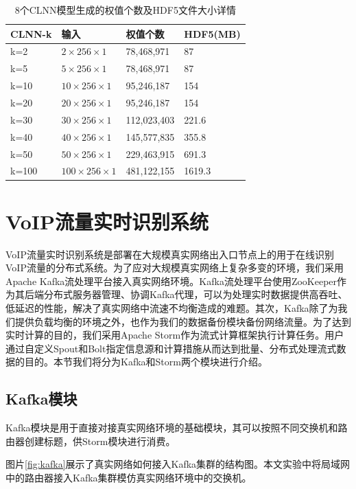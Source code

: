 \begin{table}
  \caption{8个CLNN模型生成的权值个数及HDF5文件大小详情}
  \label{tab:params}
  \centering
  \begin{tabular}{l l l l}
    \hline
    \textbf{CLNN-k} & \textbf{输入} & \textbf{权值个数}&\textbf{HDF5(MB)}\\
    \hline
    k=2      & ${2 \times 256 \times 1}$  & 78,468,971  &87  \\
    k=5      & ${5 \times 256 \times 1}$  & 78,468,971  &87  \\
    k=10      & ${10 \times 256 \times 1}$  & 95,246,187  &154  \\
    k=20      & ${20 \times 256 \times 1}$  & 95,246,187  &154 \\
    k=30     & ${30 \times 256 \times 1}$  & 112,023,403  &221.6  \\
    k=40     & ${40 \times 256 \times 1}$  & 145,577,835  &355.8 \\
    k=50     & ${50 \times 256 \times 1}$  & 229,463,915  &691.3  \\
    k=100    & ${100 \times 256 \times 1}$  & 481,122,155  &1619.3  \\
    \hline
  \end{tabular}
\end{table}

\section{VoIP流量实时识别系统}
VoIP流量实时识别系统是部署在大规模真实网络出入口节点上的用于在线识别VoIP流量的分布式系统。为了应对大规模真实网络上复杂多变的环境，我们采用Apache Kafka流处理平台接入真实网络环境。Kafka流处理平台使用ZooKeeper作为其后端分布式服务器管理、协调Kafka代理，可以为处理实时数据提供高吞吐、低延迟的性能，解决了真实网络中流速不均衡造成的难题。其次，Kafka除了为我们提供负载均衡的环境之外，也作为我们的数据备份模块备份网络流量。为了达到实时计算的目的，我们采用Apache Storm作为流式计算框架执行计算任务。用户通过自定义Spout和Bolt指定信息源和计算措施从而达到批量、分布式处理流式数据的目的。本节我们将分为Kafka和Storm两个模块进行介绍。

\subsection{Kafka模块}
Kafka模块是用于直接对接真实网络环境的基础模块，其可以按照不同交换机和路由器创建标题，供Storm模块进行消费。

图片\ref{fig:kafka}展示了真实网络如何接入Kafka集群的结构图。本文实验中将局域网中的路由器接入Kafka集群模仿真实网络环境中的交换机。

